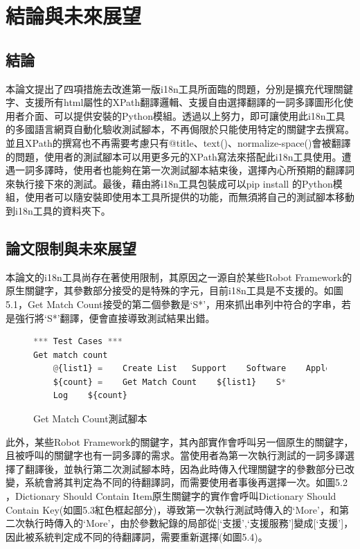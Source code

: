 \chapter{結論與未來展望}

\section{結論}
本論文提出了四項措施去改進第一版i18n工具所面臨的問題，分別是擴充代理關鍵字、支援所有html屬性的XPath翻譯邏輯、支援自由選擇翻譯的一詞多譯圖形化使用者介面、可以提供安裝的Python模組。透過以上努力，即可讓使用此i18n工具的多國語言網頁自動化驗收測試腳本，不再侷限於只能使用特定的關鍵字去撰寫。並且XPath的撰寫也不再需要考慮只有@title、text()、normalize-space()會被翻譯的問題，使用者的測試腳本可以用更多元的XPath寫法來搭配此i18n工具使用。遭遇一詞多譯時，使用者也能夠在第一次測試腳本結束後，選擇內心所預期的翻譯詞來執行接下來的測試。最後，藉由將i18n工具包裝成可以pip install 的Python模組，使用者可以隨安裝即使用本工具所提供的功能，而無須將自己的測試腳本移動到i18n工具的資料夾下。

\section{論文限制與未來展望}
本論文的i18n工具尚存在著使用限制，其原因之一源自於某些Robot Framework的原生關鍵字，其參數部分接受的是特殊的字元，目前i18n工具是不支援的。如圖5.1，Get Match Count接受的第二個參數是‘S*’，用來抓出串列中符合的字串，若是強行將‘S*’翻譯，便會直接導致測試結果出錯。

\begin{figure}[H]
\centering
\begin{lstlisting}[language={python}]
*** Test Cases ***
Get match count
    @{list1} =    Create List   Support    Software    Apple
    ${count} =    Get Match Count    ${list1}    S*
    Log    ${count} 
\end{lstlisting}
\caption{Get Match Count測試腳本}
\end{figure}

此外，某些Robot Framework的關鍵字，其內部實作會呼叫另一個原生的關鍵字，且被呼叫的關鍵字也有一詞多譯的需求。當使用者為第一次執行測試的一詞多譯選擇了翻譯後，並執行第二次測試腳本時，因為此時傳入代理關鍵字的參數部分已改變，系統會將其判定為不同的待翻譯詞，而需要使用者事後再選擇一次。如圖5.2 ，Dictionary Should Contain Item原生關鍵字的實作會呼叫Dictionary Should Contain Key(如圖5.3紅色框起部分)，導致第一次執行測試時傳入的‘More’，和第二次執行時傳入的‘More’，由於參數紀錄的局部從[‘支援’,‘支援服務’]變成[‘支援’]，因此被系統判定成不同的待翻譯詞，需要重新選擇(如圖5.4)。\\

